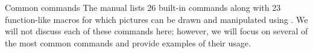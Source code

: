 \begin{section}{Common commands}
The \MP{} manual \cite{hobby:user} lists 26 built-in commands along with 23 function-like macros for which pictures can be drawn and manipulated using \MP.  We will not discuss each of these commands here; however, we will focus on several of the most common commands and provide examples of their usage.




\end{section}
